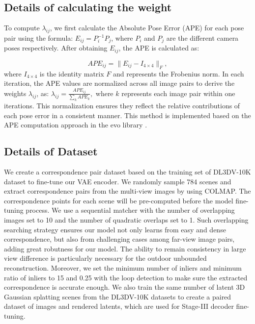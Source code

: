 \subsection{Details of calculating the weight}
\label{subsec: APE details}
To compute $\lambda_{ij}$, we first calculate the Absolute Pose Error (APE) for each pose pair using the formula: $E_{ij} = P_i^{-1} P_j$, where $P_i$ and $P_j$ are the different camera poses respectively. After obtaining $E_{ij}$, the APE is calculated as: 

\begin{equation}
    APE_{ij} = \|E_{ij} - I_{4 \times 4}\|_F,
\end{equation}
where $I_{4 \times 4}$ is the identity matrix $F$ and 
 represents the Frobenius norm. In each iteration, the APE values are normalized across all image pairs to derive the weights $\lambda_{ij}$, as: $\lambda_{ij} = \frac{APE_{ij}}{\sum_{k} {{APE}_{k}}},$ where $k$
 represents each image pair within one iterations. This normalization ensures they reflect the relative contributions of each pose error in a consistent manner. This method is implemented based on the APE computation approach in the evo library \citep{grupp2017evo}. 


\subsection{Details of Dataset}
\label{subsec: dataset}
We create a correspondence pair dataset based on the training set of DL3DV-10K \citep{ling2024dl3dv} dataset to fine-tune our VAE encoder. We randomly sample 784 scenes and extract correspondence pairs from the multi-view images by using COLMAP. The correspondence points for each scene will be pre-computed before the model fine-tuning process. We use a sequential matcher with the number of overlapping images set to 10 and the number of quadratic overlaps set to 1. Such overlapping searching strategy ensures our model not only learns from easy and dense correspondence, but also from challenging cases among far-view image pairs, adding great robutness for our model. The ability to remain consistency in large view difference is particularly necessary for the outdoor unbounded reconstruction. Moreover, we set the minimum number of inliers and minimum ratio of inliers to 15 and 0.25 with the loop detection to make sure the extracted correspondence is accurate enough. We also train the same number of latent 3D Gaussian splatting scenes from the DL3DV-10K datasets to create a paired dataset of images and rendered latents, which are used for Stage-III decoder fine-tuning. 


